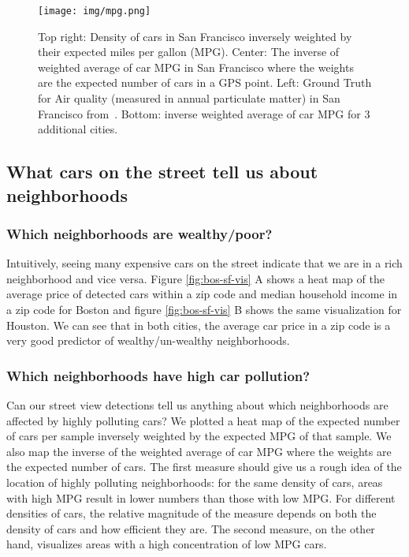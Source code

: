 \documentclass[10pt,twocolumn,letterpaper]{article}
\begin{document}
\begin{figure}[t]
\begin{center}
    \texttt{[image: img/mpg.png]}
\end{center}
   \caption { Top right: Density of cars in San Francisco inversely weighted by their expected miles per gallon (MPG). Center: The inverse of weighted average of car MPG in San Francisco where the weights are the expected number of cars in a GPS point. Left: Ground Truth for Air quality (measured in annual particulate matter) in San Francisco from~\cite{ground_air}. Bottom: inverse weighted average of car MPG for 3 additional cities.}
\label{fig:pollution}
\end{figure}

\subsection{What cars on the street tell us about neighborhoods}
\subsubsection{Which neighborhoods are wealthy/poor?}
Intuitively, seeing many expensive cars on the street indicate that we are in a rich neighborhood and vice versa. Figure \ref{fig:bos-sf-vis} A shows a heat map of the average price of detected cars within a zip code and median household income in a zip code for Boston and figure \ref{fig:bos-sf-vis} B shows the same visualization for Houston. We can see that in both cities, the average car price in a zip code is a very good predictor of wealthy/un-wealthy neighborhoods.


\subsubsection{Which neighborhoods have high car pollution?}
Can our street view detections tell us anything about which neighborhoods are affected by highly polluting cars? We plotted a heat map of the expected number of cars per sample inversely weighted by the expected MPG of that sample. We also map the inverse of the weighted average of car MPG where the weights are the expected number of cars. The first measure should give us a rough idea of the location of highly polluting neighborhoods: for the same density of cars, areas with high MPG result in lower numbers than those with low MPG. For different densities of cars, the relative magnitude of the measure depends on both the density of cars and how efficient they are. The second measure, on the other hand, visualizes areas with a high concentration of low MPG cars.
\end{document}
